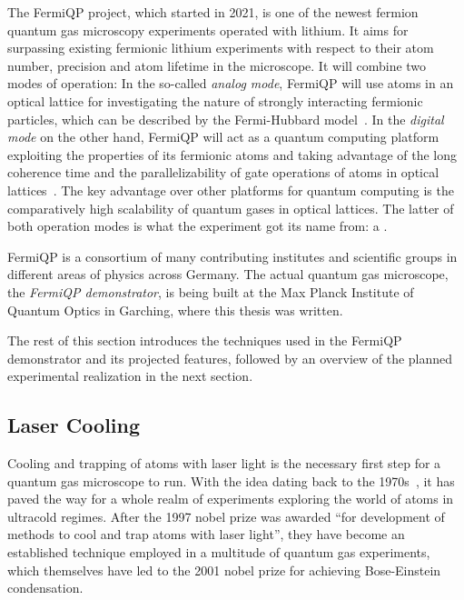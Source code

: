 The FermiQP project, which started in 2021, is one of the newest fermion quantum gas microscopy experiments operated with lithium. It aims for surpassing existing fermionic lithium experiments with respect to their atom number, precision and atom lifetime in the microscope. It will combine two modes of operation: In the so-called \textit{analog mode}, FermiQP will use atoms in an optical lattice for investigating the nature of strongly interacting fermionic particles, which can be described by the Fermi-Hubbard model~\cite{hubbard_electron_1963, esslinger_fermi-hubbard_2010}. In the \textit{digital mode} on the other hand, FermiQP will act as a quantum computing platform exploiting the properties of its fermionic atoms and taking advantage of the long coherence time and the parallelizability of gate operations of atoms in optical lattices~\cite{zhang_functional_2022}. The key advantage over other platforms for quantum computing is the comparatively high scalability of quantum gases in optical lattices. The latter of both operation modes is what the experiment got its name from: a .

FermiQP is a consortium of many contributing institutes and scientific groups in different areas of physics across Germany. The actual quantum gas microscope, the \textit{FermiQP demonstrator}, is being built at the Max Planck Institute of Quantum Optics in Garching, where this thesis was written.

The rest of this section introduces the techniques used in the FermiQP demonstrator and its projected features, followed by an overview of the planned experimental realization in the next section.

\subsection*{Laser Cooling}
Cooling and trapping of atoms with laser light is the necessary first step for a quantum gas microscope to run. With the idea dating back to the 1970s~\cite{hansch_cooling_1975}, it has paved the way for a whole realm of experiments exploring the world of atoms in ultracold regimes. After the 1997 nobel prize was awarded ``for development of methods to cool and trap atoms with laser light'', they have become an established technique employed in a multitude of quantum gas experiments, which themselves have led to the 2001 nobel prize for achieving Bose-Einstein condensation.

